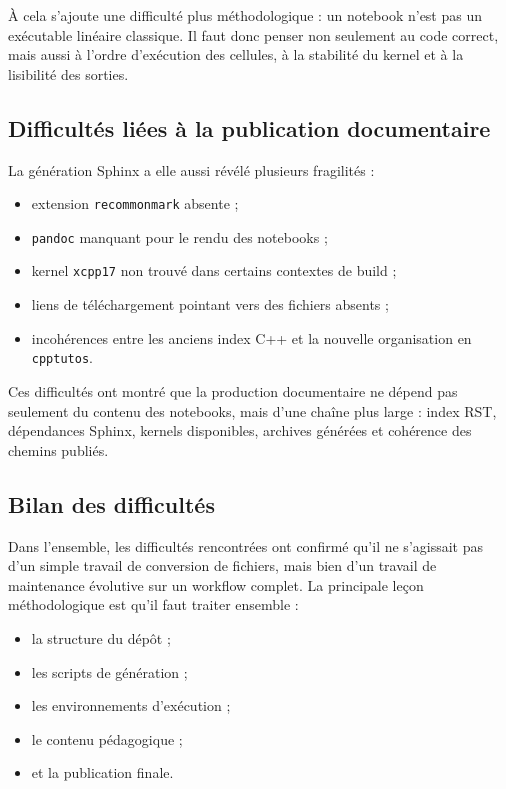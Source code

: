 \documentclass[a4paper,12pt,twoside]{article}
\begin{document}
À cela s'ajoute une difficulté plus méthodologique : un notebook n'est pas un exécutable linéaire classique. Il faut donc penser non seulement au code correct, mais aussi à l'ordre d'exécution des cellules, à la stabilité du kernel et à la lisibilité des sorties.

\subsection{Difficultés liées à la publication documentaire}

La génération Sphinx a elle aussi révélé plusieurs fragilités :
\begin{itemize}
    \item extension \texttt{recommonmark} absente ;
    \item \texttt{pandoc} manquant pour le rendu des notebooks ;
    \item kernel \texttt{xcpp17} non trouvé dans certains contextes de build ;
    \item liens de téléchargement pointant vers des fichiers absents ;
    \item incohérences entre les anciens index C++ et la nouvelle organisation en \texttt{cpptutos}.
\end{itemize}

Ces difficultés ont montré que la production documentaire ne dépend pas seulement du contenu des notebooks, mais d'une chaîne plus large : index RST, dépendances Sphinx, kernels disponibles, archives générées et cohérence des chemins publiés.

\subsection{Bilan des difficultés}

Dans l'ensemble, les difficultés rencontrées ont confirmé qu'il ne s'agissait pas d'un simple travail de conversion de fichiers, mais bien d'un travail de maintenance évolutive sur un workflow complet. La principale leçon méthodologique est qu'il faut traiter ensemble :
\begin{itemize}
    \item la structure du dépôt ;
    \item les scripts de génération ;
    \item les environnements d'exécution ;
    \item le contenu pédagogique ;
    \item et la publication finale.
\end{itemize}
\end{document}
